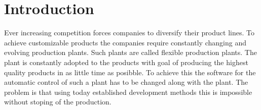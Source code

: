 
\chapter{Introduction}
\label{introduction}

Ever increasing competition forces companies to diversify
their product lines. To achieve customizable products the
companies require constantly changing and evolving
production plants. Such plants are called flexible
production plants. The plant is constantly adopted to the
products with goal of producing the highest quality products
in as little time as posibble. To achieve this the software
for the automatic control of such a plant has to be changed
along with the plant. The problem is that using today
established development methods this is impossible without
stoping of the production.







